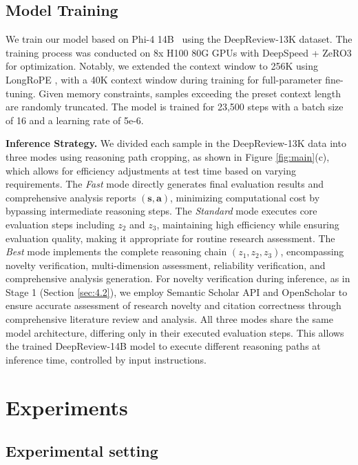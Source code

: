 \documentclass{article}
\begin{document}
\subsection{Model Training}
We train our model based on Phi-4 14B~\citep{abdin2024phi4technicalreport} using the DeepReview-13K dataset.  The training process was conducted on 8x H100 80G GPUs with DeepSpeed + ZeRO3 \citep{rajbhandari2020zeromemoryoptimizationstraining,10.1145/3394486.3406703} for optimization. Notably, we extended the context window to 256K using LongRoPE \citep{ding2024longrope}, with a 40K context window during training for full-parameter fine-tuning. Given memory constraints, samples exceeding the preset context length are randomly truncated. The model is trained for 23,500 steps with a batch size of 16 and a learning rate of 5e-6. 

\textbf{Inference Strategy.}
We divided each sample in the DeepReview-13K data into three modes using reasoning path cropping, as shown in Figure \ref{fig:main}(c), which allows for efficiency adjustments at test time based on varying requirements. The \textit{Fast} mode directly generates final evaluation results and comprehensive analysis reports $(\mathbf{s}, \mathbf{a})$, minimizing computational cost by bypassing intermediate reasoning steps. The \textit{Standard} mode executes core evaluation steps including $z_2$ and $z_3$, maintaining high efficiency while ensuring evaluation quality, making it appropriate for routine research assessment. The \textit{Best} mode implements the complete reasoning chain $(z_1,z_2,z_3)$, encompassing novelty verification, multi-dimension assessment, reliability verification, and comprehensive analysis generation. For novelty verification during inference, as in Stage 1 (Section \ref{sec:4.2}), we employ Semantic Scholar API and OpenScholar to ensure accurate assessment of research novelty and citation correctness through comprehensive literature review and analysis. All three modes share the same model architecture, differing only in their executed evaluation steps. This allows the trained DeepReview-14B model to execute different reasoning paths at inference time, controlled by input instructions.
\section{Experiments}

\subsection{Experimental setting}
\end{document}
